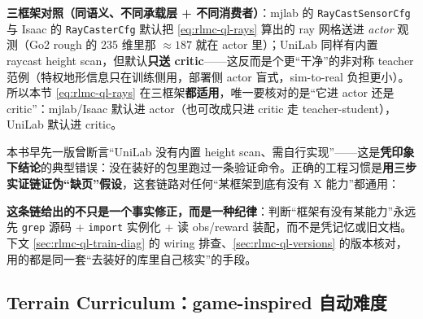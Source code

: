 \textbf{三框架对照（同语义、不同承载层 + 不同消费者）}：mjlab 的 \verb|RayCastSensorCfg| 与 Isaac 的 \verb|RayCasterCfg| 默认把 \eqref{eq:rlmc-ql-rays} 算出的 ray 网格送进 \emph{actor} 观测（Go2 rough 的 235 维里那 $\approx 187$ 就在 actor 里）；UniLab 同样有内置 raycast height scan，但默认\textbf{只送 critic}——这反而是个更“干净”的非对称 teacher 范例（特权地形信息只在训练侧用，部署侧 actor 盲式，sim-to-real 负担更小）。所以本节 \eqref{eq:rlmc-ql-rays} 在三框架\textbf{都适用}，唯一要核对的是“它进 actor 还是 critic”：mjlab/Isaac 默认进 actor（也可改成只进 critic 走 teacher-student），UniLab 默认进 critic。

\begin{insight}\label{ins:rlmc-ql-grepchain}
本书早先一版曾断言“UniLab 没有内置 height scan、需自行实现”——这是\textbf{凭印象下结论}的典型错误：没在装好的包里跑过一条验证命令。正确的工程习惯是\textbf{用三步实证链证伪“缺页”假设}，这套链路对任何“某框架到底有没有 X 能力”都通用：


\textbf{这条链给出的不只是一个事实修正，而是一种纪律}：判断“框架有没有某能力”永远先 \verb|grep| 源码 + \verb|import| 实例化 + 读 obs/reward 装配，而不是凭记忆或旧文档。下文 \cref{sec:rlmc-ql-train-diag} 的 wiring 排查、\cref{sec:rlmc-ql-versions} 的版本核对，用的都是同一套“去装好的库里自己核实”的手段。
\end{insight}

\subsection{Terrain Curriculum：game-inspired 自动难度}
\label{sec:rlmc-ql-terrain-curriculum}

